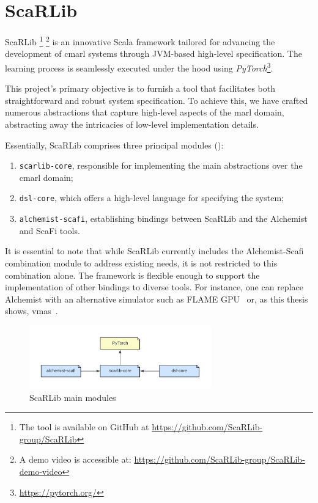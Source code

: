 \documentclass[12pt,a4paper,openright,twoside]{book}
\newcommand*{\scafi}{ScaFi}
\newcommand{\scarlib}{ScaRLib}
\begin{document}
\newpage

\section{ScaRLib}
ScaRLib \footnote{The tool is available on GitHub at \url{https://github.com/ScaRLib-group/ScaRLib}}
\footnote{A demo video is accessible at: \url{https://github.com/ScaRLib-group/ScaRLib-demo-video}} is an 
innovative Scala framework tailored for advancing the development of \ac{cmarl} systems through JVM-based high-level specification. 
The learning process is seamlessly executed under the hood using \emph{PyTorch}\footnote{\url{https://pytorch.org/}}.

This project's primary objective is to furnish a tool that facilitates both straightforward and robust system specification. 
To achieve this, we have crafted numerous abstractions that capture high-level aspects of the \ac{marl} domain, abstracting away the intricacies of low-level 
implementation details.

Essentially, \scarlib{} comprises three principal modules ():
\begin{enumerate}
    \item \texttt{scarlib-core}, responsible for implementing the main abstractions over the \ac{cmarl} domain;
    \item \texttt{dsl-core}, which offers a high-level language for specifying the system;
    \item \texttt{alchemist-scafi}, establishing bindings between \scarlib{} and the Alchemist and \scafi{} tools.
\end{enumerate}

It is essential to note that while \scarlib{} currently includes the Alchemist-Scafi combination module to address existing needs, 
it is not restricted to this combination alone. The framework is flexible enough to support the implementation of other bindings to diverse tools. 
For instance, one can replace Alchemist with an alternative simulator such as FLAME GPU~\cite{flame} or, as this thesis shows, \ac{vmas}~\cite{bettini2022vmas}.

\begin{figure}[t]
    \centering
    \includegraphics[width=0.7\textwidth]{img/scarlib-modules.pdf}
    \caption{ScaRLib main modules \cite{scarlib}}
    \label{fig:modules}
\end{figure}
\end{document}

